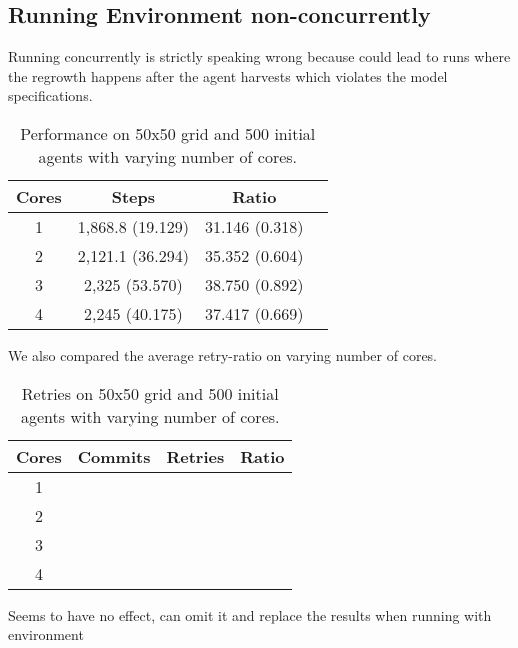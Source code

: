 \subsection{Running Environment non-concurrently}
Running concurrently is strictly speaking wrong because could lead to runs where the regrowth happens after the agent harvests which violates the model specifications. 

\begin{table}
	\centering
  	\begin{tabular}{ c || c | c | c }
        Cores & Steps            & Ratio           \\ \hline \hline 
    	1     & 1,868.8 (19.129) & 31.146 (0.318) \\ \hline
   		2     & 2,121.1 (36.294) & 35.352 (0.604) \\ \hline
   		3     & 2,325 (53.570)   & 38.750 (0.892) \\ \hline
   		4     & 2,245 (40.175)   & 37.417 (0.669) \\ \hline \hline
   	\end{tabular}
  	
  	\caption{Performance on 50x50 grid and 500 initial agents with varying number of cores.}
	\label{tab:naive_results_time}
\end{table}

We also compared the average retry-ratio on varying number of cores.

\begin{table}
	\centering
  	\begin{tabular}{ c || c | c | c }
        Cores & Commits           & Retries            & Ratio \\ \hline \hline 
    	1     &                   &                    &  \\ \hline
   		2     &                   &                    &  \\ \hline
   		3     &                   &                    &  \\ \hline
   		4     &                   &                    &  \\ \hline
   	\end{tabular}
  	
  	\caption{Retries on 50x50 grid and 500 initial agents with varying number of cores.}
	\label{tab:naive_results_retries}
\end{table}

Seems to have no effect, can omit it and replace the results when running with environment 

